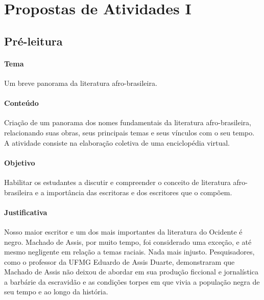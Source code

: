 \documentclass[12pt]{extarticle}
\begin{document}
\tableofcontents


\section{Propostas de Atividades I}

\subsection{Pré-leitura}

\paragraph{Tema} Um breve panorama da literatura afro-brasileira.

\paragraph{Conteúdo} Criação de um panorama dos nomes fundamentais da
literatura afro-brasileira, relacionando suas obras, seus principais
temas e seus vínculos com o seu tempo. A atividade consiste na
elaboração coletiva de uma enciclopédia virtual.

\paragraph{Objetivo} Habilitar os estudantes a discutir e compreender o
conceito de literatura afro-brasileira e a importância das escritoras e
dos escritores que o compõem.




\paragraph{Justificativa} Nosso maior escritor e um dos mais importantes
da literatura do Ocidente é negro. Machado de Assis, por muito tempo,
foi considerado uma exceção, e até mesmo negligente em relação a temas
raciais. Nada mais injusto. Pesquisadores, como o professor da UFMG
Eduardo de Assis Duarte, demonstraram que Machado de Assis não deixou de
abordar em sua produção ficcional e jornalística a barbárie da
escravidão e as condições torpes em que vivia a população negra de seu
tempo e ao longo da história.
\end{document}
